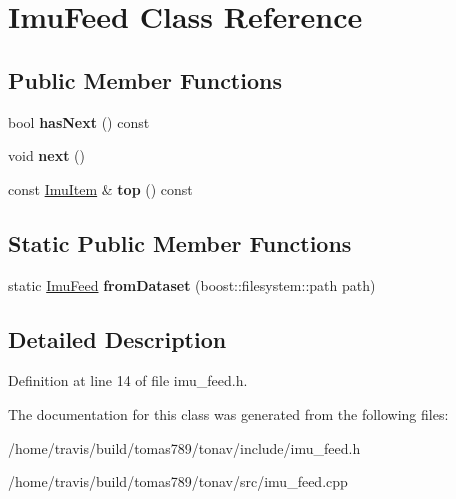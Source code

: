 \hypertarget{class_imu_feed}{\section{Imu\-Feed Class Reference}
\label{class_imu_feed}
}
\subsection*{Public Member Functions}
\begin{DoxyCompactItemize}
\item 
\hypertarget{class_imu_feed_a5ab48b9002ee9eacfe760afc579e1b50}{bool {\bfseries has\-Next} () const }\label{class_imu_feed_a5ab48b9002ee9eacfe760afc579e1b50}

\item 
\hypertarget{class_imu_feed_ab36b0a9833d5687820065483818de270}{void {\bfseries next} ()}\label{class_imu_feed_ab36b0a9833d5687820065483818de270}

\item 
\hypertarget{class_imu_feed_a48e5bf07fb20dc5f55e3078b6c57adc2}{const \hyperlink{class_imu_item}{Imu\-Item} \& {\bfseries top} () const }\label{class_imu_feed_a48e5bf07fb20dc5f55e3078b6c57adc2}

\end{DoxyCompactItemize}
\subsection*{Static Public Member Functions}
\begin{DoxyCompactItemize}
\item 
\hypertarget{class_imu_feed_a65c5b70f27e938f6a13bd55fd0bb5127}{static \hyperlink{class_imu_feed}{Imu\-Feed} {\bfseries from\-Dataset} (boost\-::filesystem\-::path path)}\label{class_imu_feed_a65c5b70f27e938f6a13bd55fd0bb5127}

\end{DoxyCompactItemize}


\subsection{Detailed Description}


Definition at line 14 of file imu\-\_\-feed.\-h.



The documentation for this class was generated from the following files\-:\begin{DoxyCompactItemize}
\item 
/home/travis/build/tomas789/tonav/include/imu\-\_\-feed.\-h\item 
/home/travis/build/tomas789/tonav/src/imu\-\_\-feed.\-cpp\end{DoxyCompactItemize}
